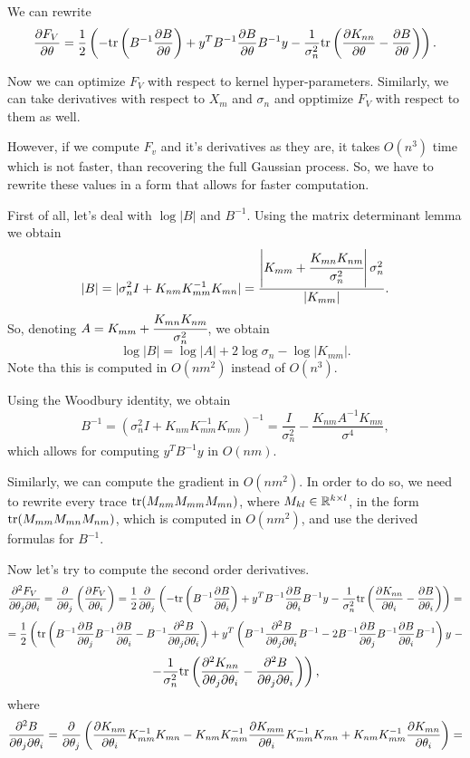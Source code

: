 \documentclass[12pt]{article}
\begin{document}
		We can rewrite
		$$\frac{\partial F_V}{\partial \theta} = \frac 1 2 \left( -\mbox{tr} \left(B^{-1} \frac{\partial B}{\partial \theta}\right) + y^T B^{-1} \frac{\partial B}{\partial \theta} B^{-1} y - \frac 1 {\sigma_n^2} \mbox{tr} \left(\frac{\partial K_{nn}}{\partial \theta} - \frac{\partial B}{\partial \theta}\right) \right).$$

		Now we can optimize $F_V$ with respect to kernel hyper-parameters. Similarly, we can take derivatives with respect to $X_m$ and $\sigma_n$ and opptimize $F_V$ with respect to them as well.

		However, if we compute $F_v$ and it's derivatives as they are, it takes $O(n^3)$ time which is not faster, than recovering the full Gaussian process. So, we have to rewrite these values in a form that allows for faster computation.

		First of all, let's deal with $\log|B|$ and $B^{-1}$. Using the matrix determinant lemma we obtain
		$$|B| = |\sigma_n^2 I + K_{nm} K_{mm}^{-1} K_{mn}| = \frac{\left|K_{mm} + \cfrac{K_{mn} K_{nm}}{\sigma_n^2}\right| \sigma_n^2}{|K_{mm}|}.$$
		So, denoting $A = K_{mm} + \cfrac{K_{mn} K_{nm}}{\sigma_n^2}$, we obtain
		$$\log |B| = \log |A| + 2 \log \sigma_n - \log |K_{mm}|.$$
		Note tha this is computed in $O(n m^2)$ instead of $O(n^3)$.

		Using the Woodbury identity, we obtain
		$$B^{-1} = (\sigma_n^2 I + K_{nm} K_{mm}^{-1} K_{mn})^{-1} = \frac I {\sigma_n^2} - \frac{K_{nm} A^{-1} K_{mn}}{\sigma^{4}},$$
		which allows for computing $y^T B^{-1} y$ in $O(n m)$.

		Similarly, we can compute the gradient in $O(nm^2)$. In order to do so, we need to rewrite every trace $\mbox{tr}(M_{nm} M_{mm} M_{mn})$, where $M_{kl} \in \mathbb{R}^{k \times l}$, in the form $\mbox{tr}(M_{mm} M_{mn} M_{nm})$, which is computed in $O(nm^2)$, and use the derived formulas for $B^{-1}$.

		Now let's try to compute the second order derivatives.
		$$\frac{\partial^2 F_V} {\partial \theta_j \partial\theta_i} = \frac{\partial }{\partial \theta_j} \left(\frac{\partial F_V}{\partial \theta_i}\right) = \frac 1 2 \frac{\partial }{\partial \theta_j} \left( -\mbox{tr} \left(B^{-1} \frac{\partial B}{\partial \theta_i}\right) + y^T B^{-1} \frac{\partial B}{\partial \theta_i} B^{-1} y - \frac 1 {\sigma_n^2} \mbox{tr} \left(\frac{\partial K_{nn}}{\partial \theta_i} - \frac{\partial B}{\partial \theta_i}\right)\right) = $$
		$$ = \frac 1 2 \left(\mbox{tr}\left( B^{-1} \frac{\partial B}{\partial \theta_j} B^{-1}\frac{\partial B}{\partial \theta_i} - B^{-1} \frac{\partial^2 B}{\partial \theta_j \partial \theta_i}\right) + y^T \left(B^{-1} \frac{\partial^2 B}{\partial \theta_j \partial \theta_i} B^{-1}  - 2 B^{-1} \frac{\partial B}{\partial \theta_j} B^{-1} \frac{\partial B}{\partial \theta_i} B^{-1} \right) y \right. - $$
		$$ \left.- \frac 1 {\sigma_n^2} \mbox{tr}\left(\frac{\partial^2 K_{nn}}{\partial \theta_j \partial \theta_i} - \frac{\partial^2 B}{\partial \theta_j \partial \theta_i}\right)\right),$$
		where
		$$\frac{\partial^2 B}{\partial \theta_j \partial \theta_i} = \frac{\partial }{\partial \theta_j} \left(\frac{\partial K_{nm}}{\partial \theta_i}K_{mm}^{-1} K_{mn} - K_{nm} K_{mm}^{-1} \frac{\partial K_{mm}}{\partial \theta_i}K_{mm}^{-1} K_{mn} +  K_{nm} K_{mm}^{-1} \frac{\partial K_{mn}}{\partial \theta_i}\right) = $$
\end{document}
